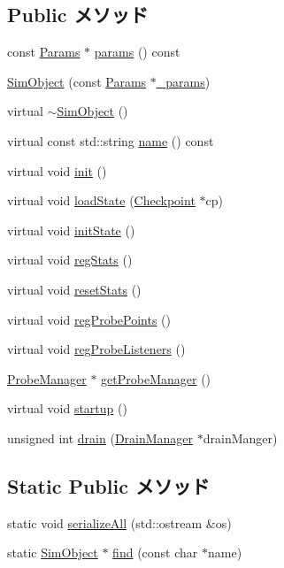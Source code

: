 \subsection*{Public メソッド}
\begin{DoxyCompactItemize}
\item 
const \hyperlink{classSimObject_a0f0761d2db586a23bb2a2880b8f387bb}{Params} $\ast$ \hyperlink{classSimObject_acd3c3feb78ae7a8f88fe0f110a718dff}{params} () const 
\item 
\hyperlink{classSimObject_a153e2844edadce7c286efc5e3a7da911}{SimObject} (const \hyperlink{classSimObject_a0f0761d2db586a23bb2a2880b8f387bb}{Params} $\ast$\hyperlink{classSimObject_acaf6024ae9dda44bfb1c67e05ad70aef}{\_\-params})
\item 
virtual \hyperlink{classSimObject_a8a5c5109a2eb74056734bb8795eca530}{$\sim$SimObject} ()
\item 
virtual const std::string \hyperlink{classSimObject_adbcff144e5e199d332a1352af1798148}{name} () const 
\item 
virtual void \hyperlink{classSimObject_a02fd73d861ef2e4aabb38c0c9ff82947}{init} ()
\item 
virtual void \hyperlink{classSimObject_a0c3e6eb311ceff72035b11f2a5e0f186}{loadState} (\hyperlink{classCheckpoint}{Checkpoint} $\ast$cp)
\item 
virtual void \hyperlink{classSimObject_a3c34ea9b29f410748d4435a667484924}{initState} ()
\item 
virtual void \hyperlink{classSimObject_a4dc637449366fcdfc4e764cdf12d9b11}{regStats} ()
\item 
virtual void \hyperlink{classSimObject_a65880e61108132689a1bd769b9187fb7}{resetStats} ()
\item 
virtual void \hyperlink{classSimObject_aa2dab17a363fd4307274d579796adcf7}{regProbePoints} ()
\item 
virtual void \hyperlink{classSimObject_aa58a8221691801138d5d9236b8c3e0fb}{regProbeListeners} ()
\item 
\hyperlink{classProbeManager}{ProbeManager} $\ast$ \hyperlink{classSimObject_aca474da5df36cfb4df4bfcdbb4df8bf9}{getProbeManager} ()
\item 
virtual void \hyperlink{classSimObject_aecc7d8debf54990ffeaaed5bac7d7d81}{startup} ()
\item 
unsigned int \hyperlink{classSimObject_a6bf479c521c7c3eb473822d953275b26}{drain} (\hyperlink{classDrainManager}{DrainManager} $\ast$drainManger)
\end{DoxyCompactItemize}
\subsection*{Static Public メソッド}
\begin{DoxyCompactItemize}
\item 
static void \hyperlink{classSimObject_acee9d39d800677e32cf1856780ff9761}{serializeAll} (std::ostream \&os)
\item 
static \hyperlink{classSimObject}{SimObject} $\ast$ \hyperlink{classSimObject_a4f441caa815630d644e19ee6bc8fce44}{find} (const char $\ast$name)
\end{DoxyCompactItemize}
